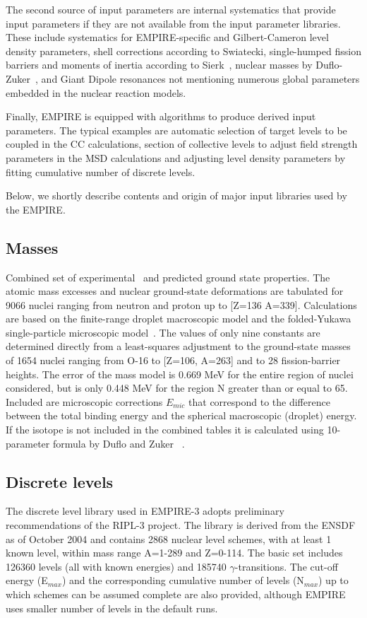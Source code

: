 \documentclass[twocolumn,amsmath,amssymb,10pt,groupedaddress,a4paper]{revtex4}
\begin{document}
The second source of input parameters are internal systematics that provide input parameters if they are not available from the input parameter libraries. These include systematics for EMPIRE-specific and Gilbert-Cameron level density parameters, shell corrections according to Swiatecki, single-humped fission barriers and moments of inertia according to Sierk~\cite{sierk}, nuclear masses by Duflo-Zuker~\cite{Duflo:96}, and Giant Dipole resonances not mentioning numerous global parameters embedded in the nuclear reaction models.

Finally, EMPIRE is equipped with algorithms to produce derived input parameters. The typical examples are automatic selection of target levels to be coupled in the CC calculations, section of collective levels to adjust field strength parameters in the MSD calculations and adjusting level density parameters by fitting cumulative number of discrete levels.

Below, we shortly describe contents and origin of major input libraries used by the EMPIRE.


\subsection{Masses}
Combined set of experimental~\cite{Audi} and predicted ground state
properties. The atomic mass excesses and nuclear ground-state deformations
are tabulated for 9066 nuclei ranging from neutron and proton up to
{[}Z=136 A=339{]}. Calculations are based on the finite-range droplet
macroscopic model and the folded-Yukawa single-particle microscopic
model~\cite{Moller95}. The values of only nine constants are determined
directly from a least-squares adjustment to the ground-state masses
of 1654 nuclei ranging from O-16 to {[}Z=106, A=263{]} and to 28 fission-barrier
heights. The error of the mass model is 0.669 MeV for the entire region
of nuclei considered, but is only 0.448 MeV for the region N greater
than or equal to 65. Included are microscopic corrections $E_{mic}$
that correspond to the difference between the total binding energy
and the spherical macroscopic (droplet) energy. If the isotope is not included
in the combined tables it is calculated using 10-parameter formula by Duflo and Zuker ~\cite{Duflo:96}.

\subsection{Discrete levels}

The discrete level library used in EMPIRE-3 adopts
preliminary recommendations of the RIPL-3 project. The library is derived
from the ENSDF as of October 2004 and contains 2868 nuclear level schemes, with at least
1 known level, within mass range A=1-289 and Z=0-114. The basic set
includes 126360 levels (all with known energies) and 185740 $\gamma$-transitions.
The cut-off energy (E$_{{max}}$) and the corresponding
cumulative number of levels (N$_{{max}}$) up to which schemes can
be assumed complete are also provided, although EMPIRE uses
smaller number of levels in the default runs.
\end{document}
